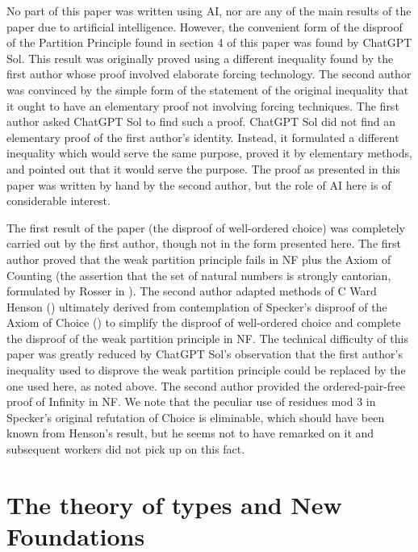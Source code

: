 \documentclass[12pt]{article}
\begin{document}
No part of this paper was written using AI, nor are any of the main results of the paper due to artificial intelligence.  However, the convenient form of the disproof of the Partition Principle found in section 4 of this paper was found by ChatGPT Sol.  This result was originally proved using a different inequality found by the first author whose proof involved elaborate forcing technology.  The second author was convinced by the simple form of the statement of the original inequality that it ought to have an elementary proof not involving forcing techniques.  The first author asked ChatGPT Sol to find such a proof.   ChatGPT Sol did not find an elementary proof
of the first author's identity.  Instead, it formulated a different inequality which would serve the same purpose, proved it by elementary methods, and pointed out that it would serve the purpose.  The proof as presented in this paper was written by hand by the second author, but the role of AI here is of considerable interest.

The first result of the paper (the disproof of well-ordered choice) was completely carried out by the first author, though not in the form presented here.  The first author proved that the weak partition principle fails in NF plus the Axiom of Counting (the assertion that the set of natural numbers is strongly cantorian, formulated by Rosser in \cite{rosserbook}).  The second author adapted methods of C Ward Henson (\cite{hensontheorem}) ultimately derived from contemplation of Specker's disproof of the Axiom of Choice (\cite{speckernotac}) to simplify the disproof of well-ordered choice and complete the disproof of the weak partition principle in NF.   The technical difficulty of this paper was greatly reduced by ChatGPT Sol's observation that the first author's inequality used to disprove the weak partition principle could be replaced by the one used here, as noted above.  The second author provided the ordered-pair-free proof of Infinity in NF.  We note that the peculiar use of residues mod 3 in Specker's original refutation of Choice is eliminable, which should have been known from Henson's result, but he seems not to have remarked on it and subsequent workers did not pick up on this fact.

\section{The theory of types and New Foundations}
\end{document}

